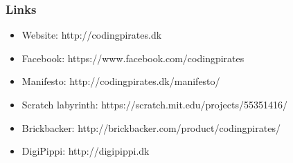 \documentclass{beamer}
\begin{document}
\begin{frame}
  \frametitle{Links}
  \begin{itemize}
  \item Website: http://codingpirates.dk
  \item Facebook: https://www.facebook.com/codingpirates
  \item Manifesto: http://codingpirates.dk/manifesto/
  \item Scratch labyrinth: https://scratch.mit.edu/projects/55351416/
  \item Brickbacker: http://brickbacker.com/product/codingpirates/
  \item DigiPippi: http://digipippi.dk
  \end{itemize}
\end{frame}
\end{document}
